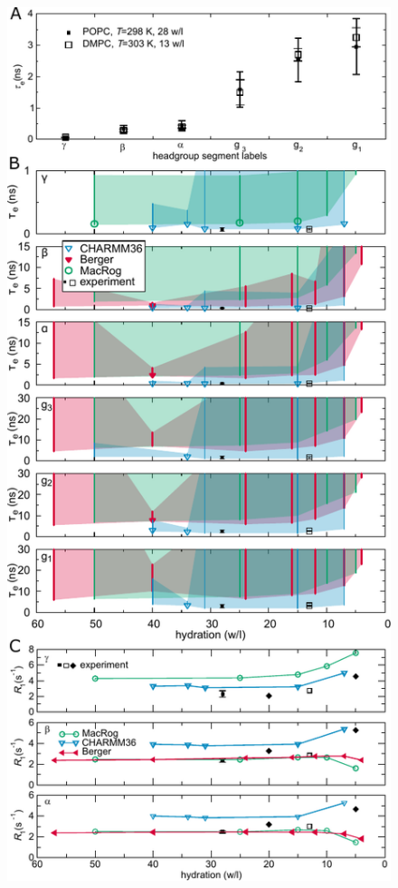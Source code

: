 \documentclass[journal=jcisd8,manuscript=article,layout=twocolumn]{achemso}
\begin{document}
\begin{figure}[ht!]
\centering
\includegraphics[width=\columnwidth]{../Figs/hydration.pdf} 


\end{figure}
\end{document}
